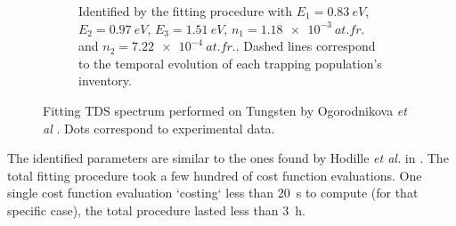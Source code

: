 \begin{figure} [h!]
\begin{subfigure}[t]{0.5\linewidth}
            \caption{Identified by the fitting procedure with $E_1 = \SI{0.83}{eV}$, $E_2 = \SI{0.97}{eV}$, $E_3 = \SI{1.51}{eV}$, $n_1 = \SI{1.18e-3}{at.fr.}$ and \newline $n_2 = \SI{7.22e-4}{at.fr.}$.  Dashed lines correspond to the temporal evolution of each trapping population's inventory.}
            \label{fig:5D TDS}
        \end{subfigure}%
    \caption{Fitting TDS spectrum performed on Tungsten by Ogorodnikova \textit{et  al} \cite{ogorodnikova_deuterium_2003}. Dots correspond to experimental data.}
\end{figure}
The identified parameters are similar to the ones found by Hodille \textit{et al.} in \cite{hodille_macroscopic_2015}.
The total fitting procedure took a few hundred of cost function evaluations.
One single cost function evaluation `costing` less than \SI{20}{s} to compute (for that specific case), the total procedure lasted less than \SI{3}{h}.





